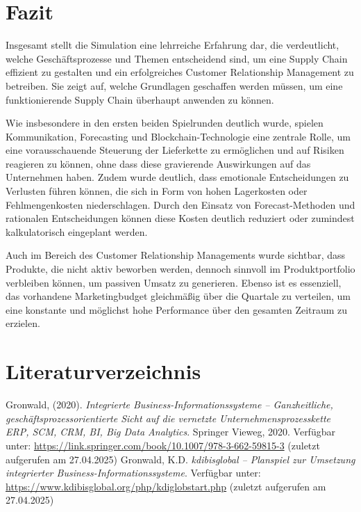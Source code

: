 \documentclass[a4paper,12pt]{article}
\begin{document}

\newpage
\section{Fazit}
Insgesamt stellt die Simulation eine lehrreiche Erfahrung dar,
die verdeutlicht, welche Geschäftsprozesse und Themen entscheidend sind,
um eine Supply Chain effizient zu gestalten und ein erfolgreiches Customer Relationship Management
zu betreiben. Sie zeigt auf, welche Grundlagen geschaffen werden müssen,
um eine funktionierende Supply Chain überhaupt anwenden zu können.

Wie insbesondere in den ersten beiden Spielrunden deutlich wurde,
spielen Kommunikation, Forecasting und Blockchain-Technologie eine zentrale Rolle,
um eine vorausschauende Steuerung der Lieferkette zu ermöglichen und auf Risiken reagieren zu können,
ohne dass diese gravierende Auswirkungen auf das Unternehmen haben. Zudem wurde deutlich,
dass emotionale Entscheidungen zu Verlusten führen können,
die sich in Form von hohen Lagerkosten oder Fehlmengenkosten niederschlagen.
Durch den Einsatz von Forecast-Methoden und rationalen Entscheidungen können diese Kosten deutlich
reduziert oder zumindest kalkulatorisch eingeplant werden.

Auch im Bereich des Customer Relationship Managements wurde sichtbar,
dass Produkte, die nicht aktiv beworben werden, dennoch sinnvoll im Produktportfolio verbleiben können,
um passiven Umsatz zu generieren. Ebenso ist es essenziell,
das vorhandene Marketingbudget gleichmäßig über die Quartale zu verteilen,
um eine konstante und möglichst hohe Performance über den gesamten Zeitraum zu erzielen.
\newpage
{}
\section*{Literaturverzeichnis}
\begin{thebibliography}{99}
     Gronwald, (2020). \textit{Integrierte Business-Informationssysteme – Ganzheitliche, geschäftsprozessorientierte Sicht auf die vernetzte Unternehmensprozesskette ERP, SCM, CRM, BI, Big Data Analytics}. Springer Vieweg, 2020. Verfügbar unter: \url{https://link.springer.com/book/10.1007/978-3-662-59815-3} (zuletzt aufgerufen am 27.04.2025)
     Gronwald, K.D. \textit{kdibisglobal – Planspiel zur Umsetzung integrierter Business-Informationssysteme}. Verfügbar unter: \url{https://www.kdibisglobal.org/php/kdiglobstart.php} (zuletzt aufgerufen am 27.04.2025)
\end{thebibliography}
\end{document}

